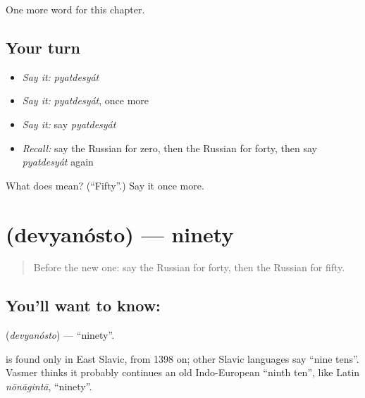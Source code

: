 \begin{grammarlens}[title={What you've built}]
One more word for this chapter.
\end{grammarlens}

\subsection*{Your turn}
\begin{itemize}
\raggedright
  \item \emph{Say it:} \emph{pyatdesyát}
  \item \emph{Say it:} \emph{pyatdesyát}, once more
  \item \emph{Say it:} say \emph{pyatdesyát}
  \item \emph{Recall:} say the Russian for zero, then the Russian for forty, then say \emph{pyatdesyát} again
\end{itemize}

\begin{tcolorbox}[breakable,colback=teal!4,colframe=teal!35!black,title={Before you move on}]
What does  mean? (\textquotedblleft{}Fifty\textquotedblright{}.) Say it once more.
\end{tcolorbox}
\section[\texorpdfstring{\ru{девяносто} (devyanósto)}{девяносто (devyanósto)}]{ (devyanósto) — ninety}

\label{lesson:RU-C76-ninety}



\begin{quote}
Before the new one: say the Russian for forty, then the Russian for fifty.
\end{quote}

\subsection*{You'll want to know: }
\textbf{} (\emph{devyanósto}) — \textquotedblleft{}ninety\textquotedblright{}.

\begin{cousinweb}
\textbf{} is found only in East Slavic, from 1398 on; other Slavic languages say \textquotedblleft{}nine tens\textquotedblright{}. Vasmer thinks it probably continues an old Indo-European \textquotedblleft{}ninth ten\textquotedblright{}, like Latin \emph{nōnāgintā}, \textquotedblleft{}ninety\textquotedblright{}.
\end{cousinweb}

